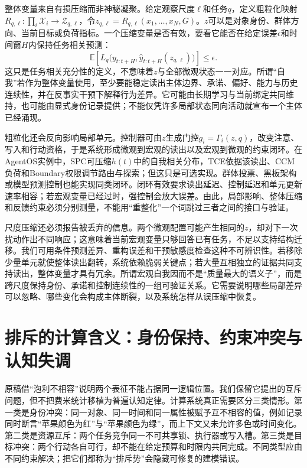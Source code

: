 整体变量来自有损压缩而非神秘凝聚。给定观察尺度$\ell$和任务$q$，定义粗粒化映射$R_{q,\ell}:\prod_i\mathcal X_i\rightarrow\mathcal Z_{q,\ell}$，令$z_{q,\ell}=R_{q,\ell}(x_1,\ldots,x_N,G)$。$z$可以是对象身份、群体方向、当前目标或负荷指标。一个压缩变量是否有效，要看它能否在给定误差$\epsilon$和时间窗$H$内保持任务相关预测：
\begin{equation}
\mathbb E\!\left[L_q\bigl(y_{t:t+H},\widehat y_{t:t+H}(z_{q,\ell})\bigr)\right]\leq\epsilon .
\end{equation}
这只是任务相关充分性的定义，不意味着$z$与全部微观状态一一对应。所谓“自我”若作为整体变量使用，至少要能稳定读出主体边界、承诺、偏好、能力与历史连续性，并在反事实干预下解释行为差异。它可能由长期学习与当前绑定共同维持，也可能由显式身份记录提供；不能仅凭许多局部状态同向活动就宣布一个主体已经涌现。

粗粒化还会反向影响局部单元。控制器可由$z$生成门控$g_i=\Gamma_i(z,q)$，改变注意、写入和行动资格，于是系统形成微观到宏观的读出以及宏观到微观的约束闭环。在AgentOS实例中，SPC可压缩$h(t)$中的自我相关分布，TCE依据该读出、CCM负荷和Boundary权限调节路由与探索；但这只是可选实现。群体投票、黑板架构或模型预测控制也能实现同类闭环。闭环有效要求读出延迟、控制延迟和单元更新速率相容；若宏观变量已经过时，强控制会放大误差。由此，局部影响、整体压缩和反馈约束必须分别测量，不能用“重整化”一个词跳过三者之间的接口与验证。

尺度压缩还必须报告被丢弃的信息。两个微观配置可能产生相同的$z$，却对下一次扰动作出不同响应；这意味着当前宏观变量只够回答已有任务，不足以支持结构迁移。我们可用条件预测差异、重构误差和干预敏感度检查这种不可辨识性。若移除少量单元就使整体读出翻转，系统依赖脆弱关键点；若大量互相独立的证据共同支持读出，整体变量才具有冗余。所谓宏观自我因而不是“质量最大的语义子”，而是跨尺度保持身份、承诺和控制连续性的一组可验证关系。它需要说明哪些局部差异可以忽略、哪些变化会构成主体断裂，以及系统怎样从误压缩中恢复。

\section{排斥的计算含义：身份保持、约束冲突与认知失调}
\label{sec:pauli_exclusion_cognitive_friction}

原稿借“泡利不相容”说明两个表征不能占据同一逻辑位置。我们保留它提出的互斥问题，但不把费米统计移植为普遍认知定律。计算系统真正需要区分三类情形。第一类是身份冲突：同一对象、同一时间和同一属性被赋予互不相容的值，例如记录同时断言“苹果颜色为红”与“苹果颜色为绿”，而上下文又未允许多色或时间变化。第二类是资源互斥：两个任务竞争同一不可共享锁、执行器或写入槽。第三类是目标冲突：两个行动各自可行，却不能在给定预算和时限内共同完成。不同类型应由不同约束解决；把它们都称为“排斥势”会隐藏可修复的建模错误。


